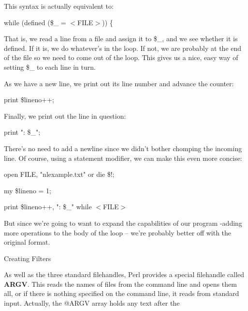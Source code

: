 \documentclass[a4paper,11pt]{book}
\begin{document}
\noindent 

\noindent This syntax is actually equivalent to:

\noindent 

\noindent while (defined (\$\_   = $<$FILE$>$)) \{

\noindent 

\noindent That is, we read a line from a file and assign it to \$\_, and we see whether it is defined. If it is, we do whatever's in the loop. If not, we are probably at the end of the file so we need to come out of the loop. This gives us a nice, easy way of setting \$\_ to each line in turn.

\noindent 

\noindent As we have a new line, we print out its line number and advance the counter:

\noindent 

\noindent print \$lineno++;

\noindent 

\noindent Finally, we print out the line in question:

\noindent 

\noindent print ": \$\_";

\noindent 

\noindent There's no need to add a newline since we didn't bother chomping the incoming line. Of course, using a statement modifier, we can make this even more concise:

\noindent 

\noindent open FILE, "nlexample.txt" or die \$!;

\noindent my \$lineno = 1;

\noindent 

\noindent print \$lineno++, ": \$\_" while $<$FILE$>$

\noindent 

\noindent But since we're going to want to expand the capabilities of our program -adding more operations to the body of the loop -- we're probably better off with the original format.

\noindent 

\noindent 

\noindent Creating Filters

\noindent As well as the three standard filehandles, Perl provides a special filehandle called \textbf{ARGV}. This reads the names of files from the command line and opens them all, or if there is nothing specified on the command line, it reads from standard input. Actually, the @ARGV array holds any text after the
\end{document}
